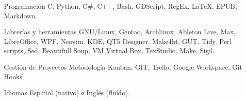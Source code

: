 

\begin{cvskills}

  \cvskill
    {Programación} %
    {C, Python, C\#, C++, Bash, GDScript, RegEx, LaTeX, EPUB, Markdown.} %

  \cvskill
    {Librerías y herramientas} %
    {GNU/Linux, Gentoo, Archlinux, Ableton Live, Max, LibreOffice, WPF, Neovim, KDE, QT5 Designer,} %
  \cvskill
    {} %
    {Make4ht, GUT, Tidy, Perl scripts, Sed, Beautifull Soup, VM Virtual Box, TexStudio, Make, Sigil.} %

  \cvskill
    {Gestión de Proyectos} %
    {Metodología Kanban, GIT, Trello, Google Workspace, Git Hooks.} %

  \cvskill
    {Idiomas} %
    {Español (nativo) e Inglés (fluído).} %


\end{cvskills}
